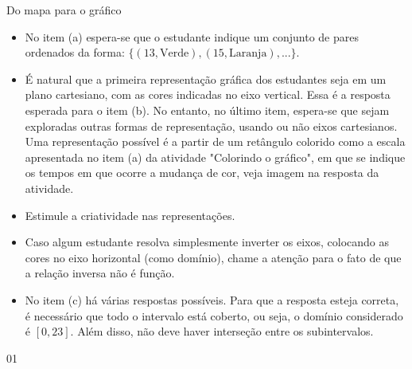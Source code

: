 \begin{sugestions}{Do mapa para o gráfico}
{
\begin{itemize}
\item No item (a) espera-se que o estudante indique um conjunto de pares ordenados da forma: $\{(13, \text{Verde}),(15, \text{Laranja}),...\}$.

\item É natural que a primeira representação gráfica dos estudantes seja em um plano cartesiano, com as cores indicadas no eixo vertical. Essa é a resposta esperada para o item (b). No entanto, no último item, espera-se que sejam exploradas outras formas de representação, usando ou não eixos cartesianos. Uma representação possível é a partir de um retângulo colorido como a escala apresentada no item (a) da atividade "Colorindo o gráfico", em que se indique os tempos em que ocorre a mudança de cor, veja imagem na resposta da atividade.

\item Estimule a criatividade nas representações.

\item Caso algum estudante resolva simplesmente inverter os eixos, colocando as cores no eixo horizontal (como domínio), chame a atenção para o fato de que a relação inversa não é função.

\item No item (c) há várias respostas possíveis. Para que a resposta esteja correta, é necessário que todo o intervalo está coberto, ou seja, o domínio considerado é $[0,23]$. Além disso, não deve haver interseção entre os subintervalos.
\end{itemize}
}{0}{1}
\end{sugestions}
